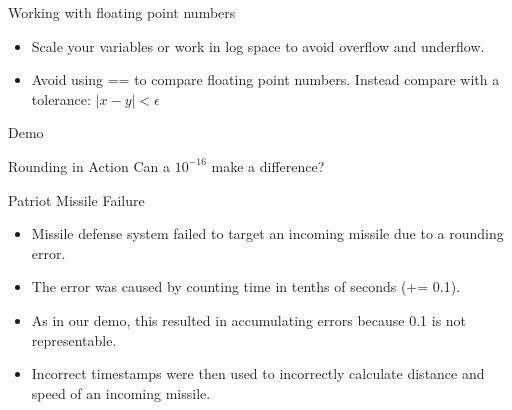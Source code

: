 \documentclass[serif,xcolor=pdftex,dvipsnames,table,hyperref={bookmarks=false,breaklinks}]{beamer}
\begin{document}
\begin{frame}[t]{Working with floating point numbers}
	\begin{itemize}[<+->]
		\item Scale your variables or work in log space to avoid overflow and underflow.
		\item Avoid using == to compare floating point numbers. Instead compare with a tolerance: $|x - y| < \epsilon$
	\end{itemize}
	
	\pause
	\centering
	\Huge{Demo}
\end{frame}

\begin{frame}[t]{Rounding in Action}
	Can a $10^{-16}$ make a difference?
	\pause
	\begin{block}{Patriot Missile Failure}
		\begin{itemize}[<+->]
			\item Missile defense system failed to target an incoming missile due to a rounding error.
			\item The error was caused by counting time in tenths of seconds (+= 0.1).
			\item As in our demo, this resulted in accumulating errors because 0.1 is not representable.
			\item Incorrect timestamps were then used to incorrectly calculate distance and speed of an incoming missile.
		\end{itemize}
	\end{block}
\end{frame}
\end{document}
